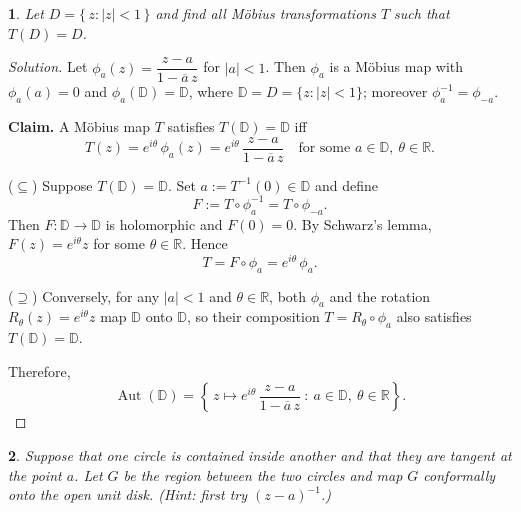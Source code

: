 \documentclass[12pt, a4paper]{report}
\theoremstyle{spaced}
\newtheorem{exercise}{}
\newcommand{\setexercise}[1]{\setcounter{exercise}{#1-1}}
\begin{document}
\setexercise{10}
\begin{exercise}
	Let \(D = \{\, z : |z| < 1 \,\}\) and find all Möbius transformations \(T\) such that \(T(D) = D\).
\end{exercise}

\begin{proof}[Solution]
	Let \(\phi_a(z)=\dfrac{z-a}{1-\overline{a}\,z}\) for \(|a|<1\). Then \(\phi_a\) is a Möbius map with
	\(\phi_a(a)=0\) and \(\phi_a(\mathbb D)=\mathbb D\), where \(\mathbb D=D=\{z:|z|<1\}\); moreover
	\(\phi_a^{-1}=\phi_{-a}\).

	\textbf{Claim.} A Möbius map \(T\) satisfies \(T(\mathbb D)=\mathbb D\) iff
	\[
		T(z)=e^{i\theta}\,\phi_a(z)=e^{i\theta}\,\frac{z-a}{1-\overline{a}\,z}
		\quad\text{for some }a\in\mathbb D,\ \theta\in\mathbb R.
	\]

	(\(\subseteq\)) Suppose \(T(\mathbb D)=\mathbb D\). Set \(a:=T^{-1}(0)\in\mathbb D\) and define
	\[
		F:=T\circ\phi_a^{-1} = T\circ\phi_{-a}.
	\]
	Then \(F:\mathbb D\to\mathbb D\) is holomorphic and \(F(0)=0\).
	By Schwarz’s lemma, \(F(z)=e^{i\theta}z\) for some \(\theta\in\mathbb R\). Hence
	\[
		T = F\circ \phi_a = e^{i\theta}\,\phi_a.
	\]

	(\(\supseteq\)) Conversely, for any \(|a|<1\) and \(\theta\in\mathbb R\),
	both \(\phi_a\) and the rotation \(R_\theta(z)=e^{i\theta}z\) map \(\mathbb D\) onto \(\mathbb D\),
	so their composition \(T=R_\theta\circ\phi_a\) also satisfies \(T(\mathbb D)=\mathbb D\).

	Therefore,
	\[
		\operatorname{Aut}(\mathbb D)
		=
		\left\{
		\, z\mapsto e^{i\theta}\,\dfrac{z-a}{1-\overline{a}\,z}
		\ :\
		a\in\mathbb D,\ \theta\in\mathbb R
		\right\}.
	\]
\end{proof}


\setexercise{14}
\begin{exercise}
	Suppose that one circle is contained inside another and that they are tangent at the point \(a\).
	Let \(G\) be the region between the two circles and map \(G\) conformally onto the open unit disk.
	\emph{(Hint: first try \((z-a)^{-1}\).)}
\end{exercise}
\end{document}
